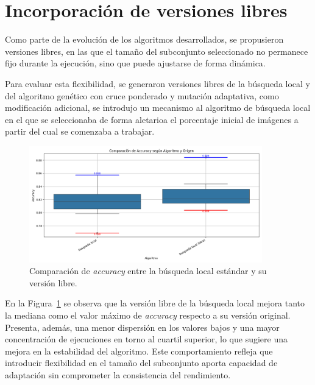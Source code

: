 \section{Incorporación de versiones libres}\label{sec:incorporacion-versiones-libres}
Como parte de la evolución de los algoritmos desarrollados, se propusieron versiones libres,
en las que el tamaño del subconjunto seleccionado no permanece fijo durante la ejecución, sino que puede ajustarse de forma dinámica.

Para evaluar esta flexibilidad, se generaron versiones libres de la búsqueda local y del algoritmo genético con cruce ponderado y mutación adaptativa,
como modificación adicional, se introdujo un mecanismo al algoritmo de búsqueda local
en el que se seleccionaba de forma aletarioa el porcentaje inicial de imágenes a partir del cual se comenzaba a trabajar.


\begin{figure}[htp]
    \centering
    \includegraphics[width=0.9\textwidth]{imagenes/evaluaciones/libres/comparacion_bl}
    \caption{Comparación de \textit{accuracy} entre la búsqueda local estándar y su versión libre.}
    \label{fig:bl_libre}
\end{figure}

En la Figura~\ref{fig:bl_libre} se observa que la versión libre de la búsqueda local mejora tanto la mediana
como el valor máximo de \textit{accuracy} respecto a su versión original.
Presenta, además, una menor dispersión en los valores bajos y una mayor concentración de ejecuciones en torno al cuartil superior,
lo que sugiere una mejora en la estabilidad del algoritmo.
Este comportamiento refleja que introducir flexibilidad en el tamaño del subconjunto aporta capacidad de adaptación sin comprometer la consistencia del rendimiento.


